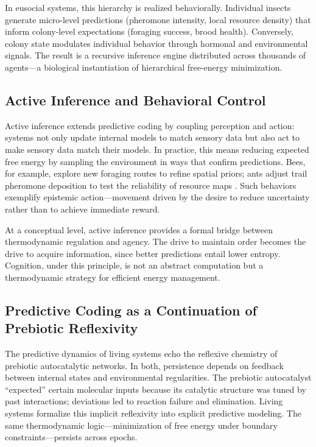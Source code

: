 \documentclass[11pt,a4paper]{article}
\begin{document}
In eusocial systems, this hierarchy is realized behaviorally.  Individual insects generate micro-level predictions (pheromone intensity, local resource density) that inform colony-level expectations (foraging success, brood health).  Conversely, colony state modulates individual behavior through hormonal and environmental signals.  The result is a recursive inference engine distributed across thousands of agents—a biological instantiation of hierarchical free-energy minimization.

\subsection{Active Inference and Behavioral Control}

Active inference extends predictive coding by coupling perception and action: systems not only update internal models to match sensory data but also act to make sensory data match their models.  In practice, this means reducing expected free energy by sampling the environment in ways that confirm predictions.  Bees, for example, explore new foraging routes to refine spatial priors; ants adjust trail pheromone deposition to test the reliability of resource maps \citep{Gordon2010AntEncounters, Seeley2010HoneybeeDemocracy}.  Such behaviors exemplify epistemic action—movement driven by the desire to reduce uncertainty rather than to achieve immediate reward.

At a conceptual level, active inference provides a formal bridge between thermodynamic regulation and agency.  The drive to maintain order becomes the drive to acquire information, since better predictions entail lower entropy.  Cognition, under this principle, is not an abstract computation but a thermodynamic strategy for efficient energy management.

\subsection{Predictive Coding as a Continuation of Prebiotic Reflexivity}

The predictive dynamics of living systems echo the reflexive chemistry of prebiotic autocatalytic networks.  In both, persistence depends on feedback between internal states and environmental regularities.  The prebiotic autocatalyst “expected” certain molecular inputs because its catalytic structure was tuned by past interactions; deviations led to reaction failure and elimination.  Living systems formalize this implicit reflexivity into explicit predictive modeling.  The same thermodynamic logic—minimization of free energy under boundary constraints—persists across epochs.
\end{document}
